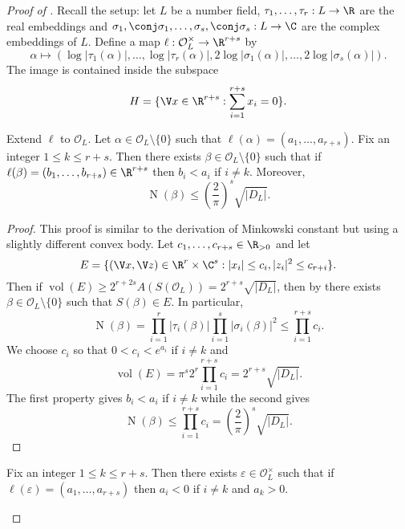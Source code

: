\documentclass[a4paper]{article}
\renewcommand*{\O}{\mathcal{O}}
\DeclareMathOperator{\n}{N}
\DeclareMathOperator{\vol}{vol}
\begin{document}
\begin{proof}[Proof of ]
  Recall the setup: let \(L\) be a number field, \(\tau_1, \dots, \tau_r: L \to \R\) are the real embeddings and \(\sigma_1, \conj \sigma_1, \dots, \sigma_s, \conj \sigma_s: L \to \C\) are the complex embeddings of \(L\). Define a map \(\ell: \O_L^\times \to \R^{r + s}\) by
  \[
    \alpha \mapsto (\log |\tau_1(\alpha)|, \dots, \log |\tau_r(\alpha)|, 2\log |\sigma_1(\alpha)|, \dots, 2\log |\sigma_s(\alpha)|).
  \]
  The image is contained inside the subspace
  \[
    H = \{ \V x \in \R^{r + s}: \sum_{i = 1}^{r + s} x_i = 0\}.
  \]

  \begin{lemma}
    Extend \(\ell\) to \(\O_L\). Let \(\alpha \in \O_L \setminus \{0\}\) such that \(\ell(\alpha) = (a_1, \dots, a_{r + s})\). Fix an integer \(1 \leq k \leq r + s\). Then there exists \(\beta \in \O_L \setminus \{0\}\) such that if \(\ell(\beta) = (b_1, \dots, b_{r + s}) \in \R^{r + s}\) then \(b_i < a_i\) if \(i \neq k\). Moreover,
    \[
      \n(\beta) \leq \left( \frac{2}{\pi} \right)^s \sqrt{|D_L|}.
    \]
  \end{lemma}

  \begin{proof}
    This proof is similar to the derivation of Minkowski constant but using a slightly different convex body. Let \(c_1, \dots, c_{r + s} \in \R_{> 0}\) and let
    \[
      E = \{(\V x, \V z) \in \R^r \times \C^s: |x_i| \leq c_i, |z_i|^2 \leq c_{r + i}\}.
    \]
    Then if \(\vol(E) \geq 2^{r + 2s} A(S(\O_L)) = 2^{r + s} \sqrt{|D_L|}\), then by  there exists \(\beta \in \O_L \setminus \{0\}\) such that \(S(\beta) \in E\). In particular,
    \[
      \n(\beta) = \prod_{i = 1}^r |\tau_i(\beta)| \prod_{i = 1}^s |\sigma_i(\beta)|^2 \leq \prod_{i = 1}^{r + s} c_i.
    \]
    We choose \(c_i\) so that \(0 < c_i < e^{a_i}\) if \(i \neq k\) and
    \[
      \vol(E) = \pi^s 2^r \prod_{i = 1}^{r + s} c_i = 2^{r + s} \sqrt{|D_L|}.
    \]
    The first property gives \(b_i < a_i\) if \(i \neq k\) while the second gives
    \[
      \n(\beta) \leq \prod_{i = 1}^{r + s} c_i = \left( \frac{2}{\pi} \right)^s \sqrt{|D_L|}.
    \]
  \end{proof}

  \begin{corollary}
    \label{cor:Dirichlet corollary 2}
    Fix an integer \(1 \leq k \leq r + s\). Then there exists \(\varepsilon \in \O_L^\times\) such that if \(\ell(\varepsilon) = (a_1, \dots, a_{r + s})\) then \(a_i < 0\) if \(i \neq k\) and \(a_k > 0\).
  \end{corollary}


\end{proof}
\end{document}
